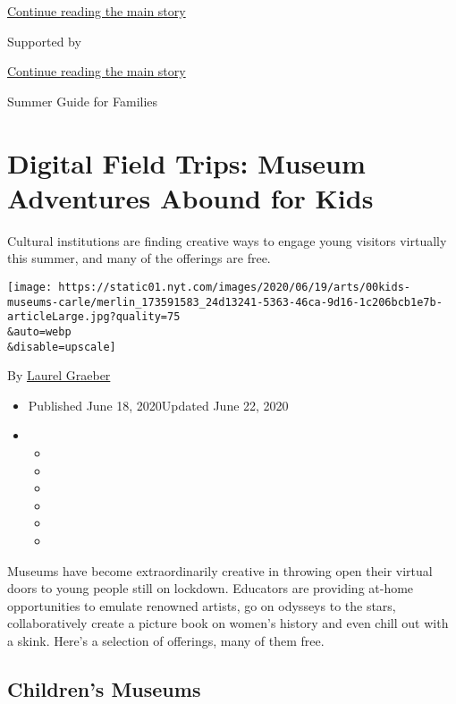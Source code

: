 \protect\hyperlink{after-top}{Continue reading the main story}

Supported by

\protect\hyperlink{after-sponsor}{Continue reading the main story}

Summer Guide for Families

\hypertarget{digital-field-trips-museum-adventures-abound-for-kids}{%
\section{Digital Field Trips: Museum Adventures Abound for
Kids}\label{digital-field-trips-museum-adventures-abound-for-kids}}

Cultural institutions are finding creative ways to engage young visitors
virtually this summer, and many of the offerings are free.

\texttt{[image: https://static01.nyt.com/images/2020/06/19/arts/00kids-museums-carle/merlin\_173591583\_24d13241-5363-46ca-9d16-1c206bcb1e7b-articleLarge.jpg?quality=75\\\&auto=webp\\\&disable=upscale]}

By \href{https://www.nytimes.com/by/laurel-graeber}{Laurel Graeber}

\begin{itemize}
\item
  Published June 18, 2020Updated June 22, 2020
\item
  \begin{itemize}
  \item
  \item
  \item
  \item
  \item
  \item
  \end{itemize}
\end{itemize}

Museums have become extraordinarily creative in throwing open their
virtual doors to young people still on lockdown. Educators are providing
at-home opportunities to emulate renowned artists, go on odysseys to the
stars, collaboratively create a picture book on women's history and even
chill out with a skink. Here's a selection of offerings, many of them
free.

\hypertarget{childrens-museums}{%
\subsection{Children's Museums}\label{childrens-museums}}

